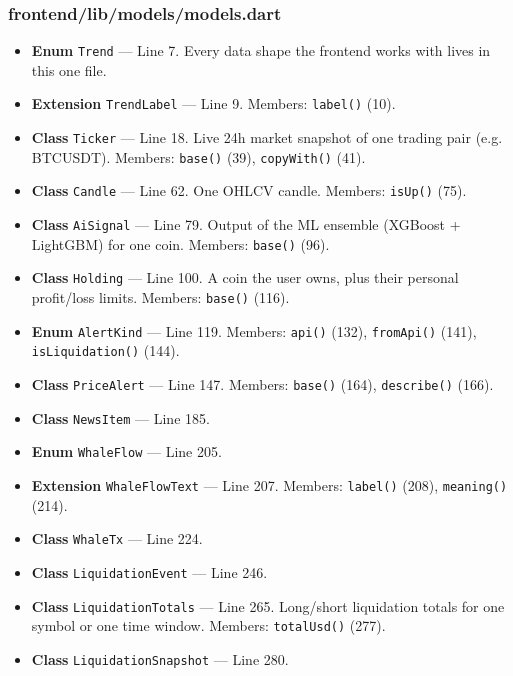 \subsubsection*{frontend/lib/models/models.dart}
\begin{itemize}[nosep,leftmargin=1.5em]
\item \textbf{Enum} \texttt{Trend} --- Line 7. Every data shape the frontend works with lives in this one file.
\item \textbf{Extension} \texttt{TrendLabel} --- Line 9. Members: \texttt{label(\allowbreak{})} (10).
\item \textbf{Class} \texttt{Ticker} --- Line 18. Live 24h market snapshot of one trading pair (e.g. BTCUSDT). Members: \texttt{base(\allowbreak{})} (39), \texttt{copyWith(\allowbreak{})} (41).
\item \textbf{Class} \texttt{Candle} --- Line 62. One OHLCV candle. Members: \texttt{isUp(\allowbreak{})} (75).
\item \textbf{Class} \texttt{AiSignal} --- Line 79. Output of the ML ensemble (XGBoost + LightGBM) for one coin. Members: \texttt{base(\allowbreak{})} (96).
\item \textbf{Class} \texttt{Holding} --- Line 100. A coin the user owns, plus their personal profit/loss limits. Members: \texttt{base(\allowbreak{})} (116).
\item \textbf{Enum} \texttt{AlertKind} --- Line 119. Members: \texttt{api(\allowbreak{})} (132), \texttt{fromApi(\allowbreak{})} (141), \texttt{isLiquidation(\allowbreak{})} (144).
\item \textbf{Class} \texttt{PriceAlert} --- Line 147. Members: \texttt{base(\allowbreak{})} (164), \texttt{describe(\allowbreak{})} (166).
\item \textbf{Class} \texttt{NewsItem} --- Line 185.
\item \textbf{Enum} \texttt{WhaleFlow} --- Line 205.
\item \textbf{Extension} \texttt{WhaleFlowText} --- Line 207. Members: \texttt{label(\allowbreak{})} (208), \texttt{meaning(\allowbreak{})} (214).
\item \textbf{Class} \texttt{WhaleTx} --- Line 224.
\item \textbf{Class} \texttt{LiquidationEvent} --- Line 246.
\item \textbf{Class} \texttt{LiquidationTotals} --- Line 265. Long/short liquidation totals for one symbol or one time window. Members: \texttt{totalUsd(\allowbreak{})} (277).
\item \textbf{Class} \texttt{LiquidationSnapshot} --- Line 280.

\end{itemize}

